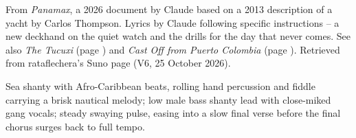 
\label{sec:ten-on-the-watch}
\begin{notes}
From \emph{Panamax}, a 2026 document by Claude based on a 2013 description of a yacht by Carlos Thompson. Lyrics by Claude following specific instructions -- a new deckhand on the quiet watch and the drills for the day that never comes. See also \emph{The Tucuxi} (page \pageref{sec:the-tucuxi}) and \emph{Cast Off from Puerto Colombia} (page \pageref{sec:cast-off-from-puerto-colombia}). Retrieved from rataflechera's Suno page (V6, 25 October 2026).
\end{notes}
\begin{style}
Sea shanty with Afro-Caribbean beats, rolling hand percussion and fiddle carrying a brisk nautical melody; low male bass shanty lead with close-miked gang vocals; steady swaying pulse, easing into a slow final verse before the final chorus surges back to full tempo.
\end{style}
